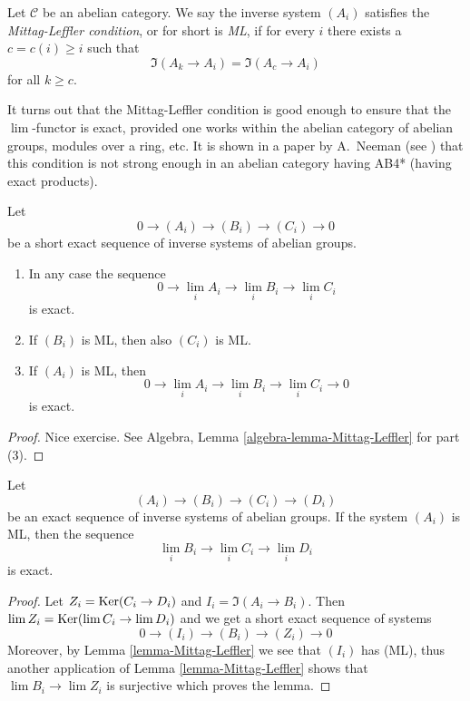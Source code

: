 \begin{definition}
\label{definition-Mittag-Leffler}
Let $\mathcal{C}$ be an abelian category.
We say the inverse system $(A_i)$
satisfies the {\it Mittag-Leffler condition}, or for short
is {\it ML}, if for every $i$ there exists a $c = c(i) \geq i$
such that
$$
\Im(A_k \to A_i) = \Im(A_c \to A_i)
$$
for all $k \geq c$.
\end{definition}

\noindent
It turns out that the Mittag-Leffler condition is good enough to ensure
that the $\lim$-functor is exact, provided one works within
the abelian category of abelian groups, modules over a ring, etc.
It is shown in a paper by A.\ Neeman (see \cite{Neeman-Counterexample})
that this condition is not strong enough in an abelian
category having AB4* (having exact products).

\begin{lemma}
\label{lemma-Mittag-Leffler}
Let
$$
0 \to (A_i) \to (B_i) \to (C_i) \to 0
$$
be a short exact sequence of inverse systems of abelian groups.
\begin{enumerate}
\item In any case the sequence
$$
0 \to \lim_i A_i \to \lim_i B_i \to \lim_i C_i
$$
is exact.
\item If $(B_i)$ is ML, then also $(C_i)$ is ML.
\item If $(A_i)$ is ML, then
$$
0 \to \lim_i A_i \to \lim_i B_i \to \lim_i C_i \to 0
$$
is exact.
\end{enumerate}
\end{lemma}

\begin{proof}
Nice exercise. See
Algebra, Lemma \ref{algebra-lemma-Mittag-Leffler} for part (3).
\end{proof}

\begin{lemma}
\label{lemma-apply-Mittag-Leffler}
Let
$$
(A_i) \to (B_i) \to (C_i) \to (D_i)
$$
be an exact sequence of inverse systems of abelian groups. If the
system $(A_i)$ is ML, then the sequence
$$
\lim_i B_i \to \lim_i C_i \to \lim_i D_i
$$
is exact.
\end{lemma}

\begin{proof}
Let $Z_i = \mathop{\mathrm{Ker}}(C_i \to D_i)$ and $I_i = \Im(A_i \to B_i)$.
Then $\mathop{\mathrm{lim}}\nolimits Z_i = \mathop{\mathrm{Ker}}(\mathop{\mathrm{lim}}\nolimits C_i \to \mathop{\mathrm{lim}}\nolimits D_i)$ and
we get a short exact sequence of systems
$$
0 \to (I_i) \to (B_i) \to (Z_i) \to 0
$$
Moreover, by
Lemma \ref{lemma-Mittag-Leffler}
we see that $(I_i)$ has (ML), thus another application of
Lemma \ref{lemma-Mittag-Leffler}
shows that $\lim B_i \to \lim Z_i$ is surjective which
proves the lemma.
\end{proof}

